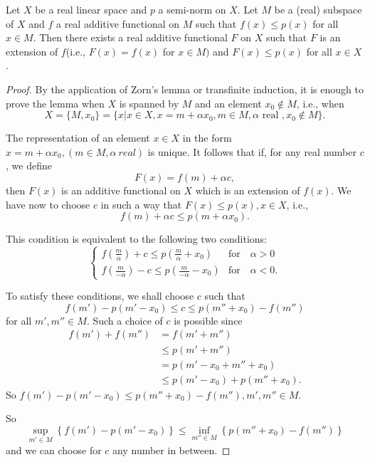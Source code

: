 Let $X$ be a real linear space and $p$ a semi-norm on $X$. Let $M$ be
a (real) subspace of $X$ and $f$ a real additive functional on $M$
such that $f(x) \le p(x)$ for all $x \in M$. Then there exists a real\pageoriginale
additive functional $F$ on $X$ such that $F$ is an extension of
$f$(i.e., $F(x) = f(x)$ for $ x \in M)$ and $F(x) \le p(x)$ for all $x
\in X$. 

\begin{proof}
 By the application of Zorn's lemma or transfinite induction, it is
 enough to prove the lemma when $X$ is spanned by $M$ and an element
 $x_0 \notin M$, i.e., when 
 $$
 X = \{ M, x_0\} = \{x | x \in X, x =m + \alpha x_0, m \in M, \alpha
 \text{ real }, x_0 \notin M \}.  
 $$

 The representation of an element $x \in X$ in the form $x = m +
 \alpha x_0, (m \in M, \alpha ~real)$ is unique. It follows that if,
 for any real number $c$, we define 
 $$
 F(x) = f(m) + \alpha c, 
 $$
 then $F(x) $ is an additive functional on $X$ which is an extension
 of $f(x)$. We have now to choose $c$ in such a way that $F(x)\le
 p(x), x \in X$, i.e., 
 $$
 f(m) + \alpha c \le p(m + \alpha x_0). 
 $$

 This condition is equivalent to the following two conditions: 
 $$
 \begin{cases}
  f\left(\frac{m}{\alpha}\right)+ c \le p \left(\frac{m}{\alpha} +
  x_0\right)
  &\text{for} \quad \alpha > 0\\[5pt]
  f\left(\frac{m}{-\alpha}\right) - c \le p \left(\frac{m}{-\alpha} -
  x_0\right) &\text{for} \quad \alpha < 0. 
 \end{cases}
 $$
 
 To satisfy these conditions, we shall choose $c$ such that
 $$
 f(m') - p(m' - x_0) \le c \le p(m'' + x_0) - f(m'')
 $$
 for all $m', m'' \in M$. Such a choice of $c$ is possible since
 \begin{align*}
  f(m') + f(m'') & = f(m' + m'')\\
  & \le p(m' + m'')\\
  & = p(m' - x_0 + m'' + x_0)\\
  &\le p(m' - x_0) + p(m'' + x_0).
 \end{align*}
 So \quad $f(m') - p(m' - x_0) \le p(m'' + x_0) - f(m''), m', m'' \in M$. 
 
 So\pageoriginale
 $$
 \sup_{m' \in M} \left\{f(m') - p(m' -x_0) \right\} \le \inf_{m'' \in
  M} \left\{ p(m'' + x_0) - f(m'') \right\} 
 $$
 and we can choose for $c$ any number in between.
\end{proof}

